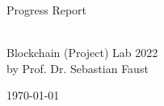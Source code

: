 \begin {center}

\vspace{1 in}

{\Huge Progress Report}

\vspace {2 in}

{\Huge \textbf{\thetitle}} \\ 
\vspace{1 in}
{\Huge Blockchain (Project) Lab 2022} \\
{\huge by Prof. Dr. Sebastian Faust} \\

\vspace{0.5 in}

{\Large \today}

\vspace{1,5 in}

{\Large \textit \theauthor} 
\end {center}
